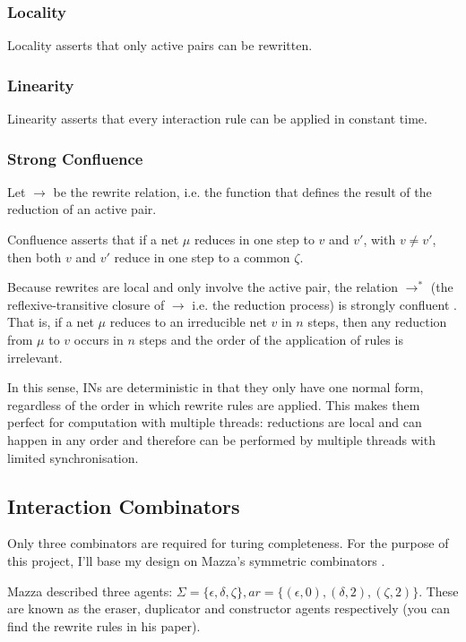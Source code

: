 \documentclass{article}
\begin{document}
\subsubsection{Locality}

Locality asserts that only active pairs can be rewritten.

\subsubsection{Linearity}

Linearity asserts that every interaction rule can be applied in constant time.

\subsubsection{Strong Confluence}

Let $\rightarrow$ be the rewrite relation, i.e. the function that defines the result of the reduction of an active pair.

Confluence asserts that if a net $\mu$ reduces in one step to $v$ and $v'$, with $v\ne v'$, then both $v$ and $v'$ reduce in one step to a common $\zeta$.

Because rewrites are local and only involve the active pair, the relation $\rightarrow^*$ (the reflexive-transitive closure of $\rightarrow$ i.e. the reduction process) is strongly confluent \cite{mazza}. That is, if a net $\mu$ reduces to an irreducible net $v$ in $n$ steps, then any reduction from $\mu$ to $v$ occurs in $n$ steps and the order of the application of rules is irrelevant.

In this sense, INs are deterministic in that they only have one normal form, regardless of the order in which rewrite rules are applied. This makes them perfect for computation with multiple threads: reductions are local and can happen in any order and therefore can be performed by multiple threads with limited synchronisation.

\subsection{Interaction Combinators}
Only three combinators are required for turing completeness. For the purpose of this project, I'll base my design on Mazza's symmetric combinators \cite{mazza}.

Mazza described three agents: $\Sigma = \{\epsilon, \delta, \zeta\}, ar = \{(\epsilon, 0), (\delta, 2), (\zeta, 2)\}$. These are known as the eraser, duplicator and constructor agents respectively (you can find the rewrite rules in his paper).
\end{document}
